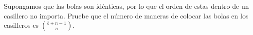 \begin{statement}{3}
  Supongamos que las bolas son id\'enticas, por lo que el orden de estas dentro de un casillero no importa.
  Pruebe que el n\'umero de maneras de colocar las bolas en los casilleros es $\binom{b + n - 1}{n}$.
\end{statement}